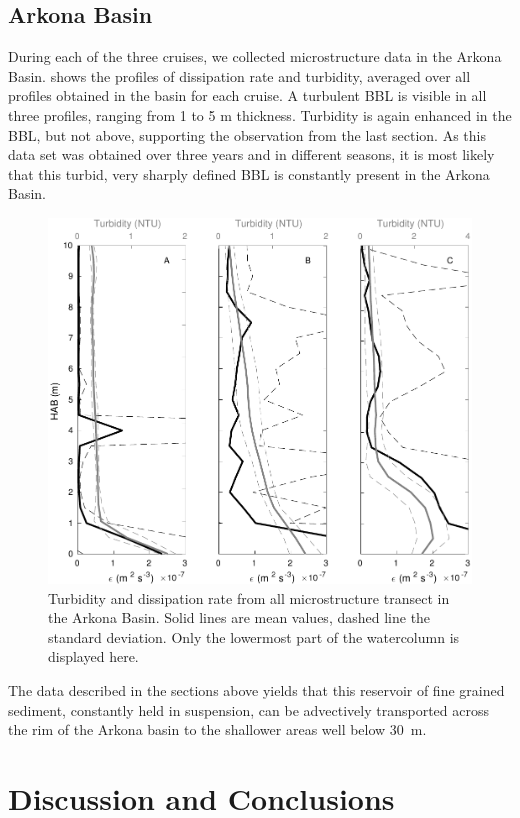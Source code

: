 \FloatBarrier
\subsection{Arkona Basin}

 During each of the three cruises, we collected microstructure data in the 
Arkona Basin.  shows the profiles of dissipation rate and turbidity, 
averaged over all profiles obtained in the basin for each cruise. A turbulent 
BBL is visible in all three profiles, ranging from 1 to 5 m thickness. 
Turbidity is again enhanced in the BBL, but not above, supporting the 
observation from the last section. As this data set was obtained over three 
years and in different seasons, it is most likely that this turbid, very 
sharply defined BBL is constantly present in the Arkona Basin.

   \begin{figure}[ht]
\includegraphics[width=15cm]{bilder/arkona_mss.pdf}
 \caption{Turbidity and dissipation rate from all microstructure transect in 
the Arkona Basin. Solid lines are mean values, dashed line the standard 
deviation. Only the lowermost part of the watercolumn is displayed here.}
 \label{abmss}
 \end{figure}

The data described in the sections above yields that this reservoir of fine 
grained sediment, constantly held in suspension, can be advectively 
transported across the rim of the Arkona basin to the shallower areas well 
below 30~m. 

\section{Discussion and Conclusions}


